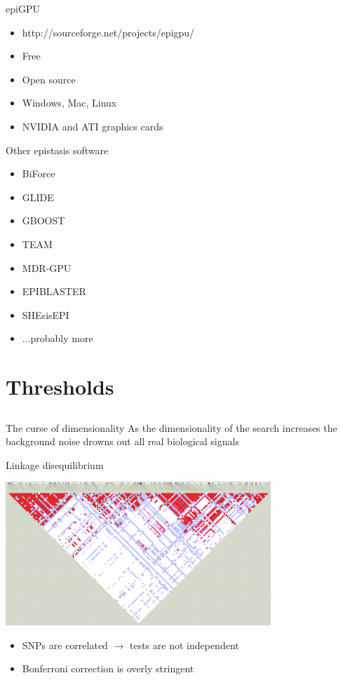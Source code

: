 \documentclass{beamer}
\begin{document}
\begin{frame}{epiGPU}
\begin{itemize}
\item http://sourceforge.net/projects/epigpu/
\item Free
\item Open source
\item Windows, Mac, Linux
\item NVIDIA and ATI graphics cards
\end{itemize}
\end{frame}


\begin{frame}{Other epistasis software}
\begin{itemize}
\item BiForce
\item GLIDE
\item GBOOST
\item TEAM
\item MDR-GPU
\item EPIBLASTER
\item SHEsisEPI
\item ...probably more
\end{itemize}
\end{frame}


\section{Thresholds}
\subsection{}

\begin{frame}{The curse of dimensionality}
As the dimensionality of the search increases the background noise drowns out all real biological signals
\end{frame}

\begin{frame}{Linkage disequilibrium}
\begin{center}
\includegraphics[width=10cm]{ld.png}
\end{center}
\begin{itemize}
\item SNPs are correlated $\rightarrow$ tests are not independent
\item Bonferroni correction is overly stringent
\end{itemize}
\end{frame}
\end{document}
